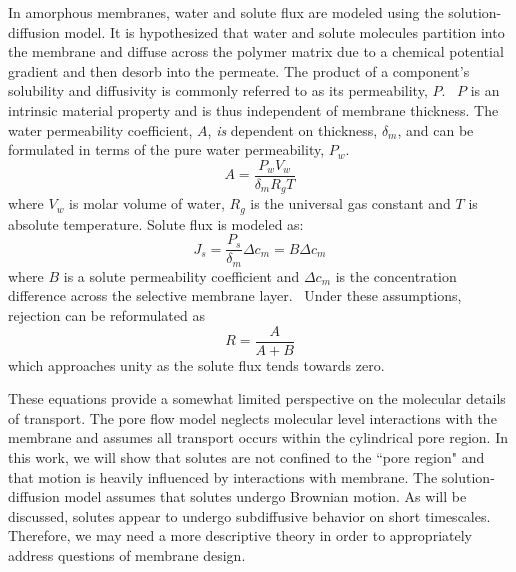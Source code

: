   In amorphous membranes, water and solute flux are modeled using the solution-diffusion 
  model. It is hypothesized that water and solute molecules partition into the
  membrane and diffuse across the polymer matrix due to a chemical potential gradient
  and then desorb into the permeate. The product of a component's solubility and 
  diffusivity is commonly referred to as its permeability, $P$.~\cite{wijmans_solution-diffusion_1995}
  $P$ is an intrinsic material property and is thus independent of membrane thickness.  %
  The water permeability coefficient, $A$, \textit{is} dependent on thickness, $\delta_m$,
  and can be formulated in terms of the pure water permeability, $P_w$.
  \begin{equation}
    A = \frac{P_wV_w}{\delta_mR_gT}
  \end{equation}
  where $V_w$ is molar volume of water, $R_g$ is the universal gas constant and $T$ is
  absolute temperature. Solute flux is modeled as:
  \begin{equation}
    J_s = \frac{P_s}{\delta_m}\Delta c_m = B\Delta c_m
  \end{equation}
  where $B$ is a solute permeability coefficient and $\Delta c_m$ is the concentration
  difference across the selective membrane layer.~\cite{geise_fundamental_2014}
  Under these assumptions, rejection can be reformulated as
  \begin{equation}
    R = \frac{A}{A + B}
  \end{equation}
  which approaches unity as the solute flux tends towards zero.~\cite{van_der_bruggen_review_2003}
  
  These equations provide a somewhat limited perspective on the molecular details
  of transport. The pore flow model neglects molecular level interactions with the 
  membrane and assumes all transport occurs within the cylindrical pore region. In
  this work, we will show that solutes are not confined to the ``pore region" and 
  that motion is heavily influenced by interactions with membrane. The 
  solution-diffusion model assumes that solutes undergo Brownian motion. As will
  be discussed, solutes appear to undergo subdiffusive behavior on short timescales. 
  Therefore, we may need a more descriptive theory in order to appropriately address
  questions of membrane design.
  

